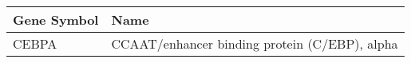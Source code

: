 \begin{tabular}{ll}
\toprule
Gene Symbol &                                          Name \\
\midrule
      CEBPA & CCAAT/enhancer binding protein (C/EBP), alpha \\
\bottomrule
\end{tabular}
